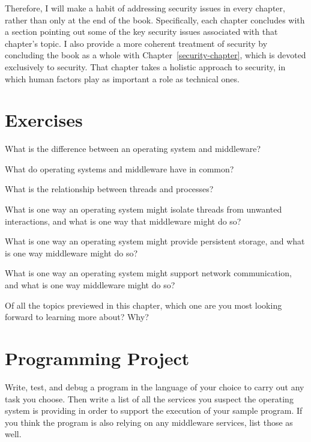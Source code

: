 Therefore, I will make a habit of addressing security issues in every
chapter, rather than only at the end of the book.  Specifically, each
chapter concludes with a section pointing out some of the key security
issues associated with that chapter's topic.  I also provide a more
coherent treatment of security by concluding the book as a whole with
Chapter~\ref{security-chapter}, which is devoted exclusively to security.
That chapter takes a holistic approach to security, in which human
factors play as important a role as technical ones.

\section*{Exercises}

\begin{chapterEnumerate}
\item
What is the difference between an operating system and middleware?
\item
What do operating systems and middleware have in common?
\item
What is the relationship between threads and processes?
\item
What is one way an operating system might isolate threads from
unwanted interactions, and what is one way that middleware might do so?
\item
What is one way an operating system might provide persistent storage,
and what is one way middleware might do so?
\item
What is one way an operating system might support network
communication, and what is one way middleware might do so?
\item
Of all the topics previewed in this chapter, which one are you most
looking forward to learning more about?  Why?
\end{chapterEnumerate}

\section*{Programming Project}
\begin{chapterEnumerate}
\item
Write, test, and debug a program in the language of your choice to
carry out any task you choose.  Then write a list of all the services
you suspect the operating system is providing in order to support the
execution of your sample program.  If you think the program is also
relying on any middleware services, list those as well.
\end{chapterEnumerate}

